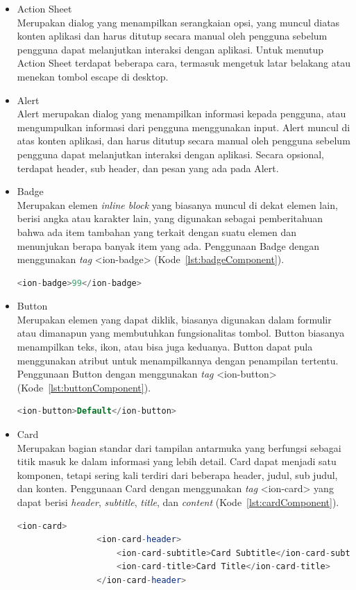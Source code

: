 \begin{itemize}
	\item Action Sheet \\
	Merupakan dialog yang menampilkan serangkaian opsi, yang muncul diatas konten aplikasi dan harus ditutup secara manual oleh pengguna sebelum pengguna dapat melanjutkan interaksi dengan aplikasi. Untuk menutup Action Sheet terdapat beberapa cara, termasuk mengetuk latar belakang atau menekan tombol escape di desktop.

	\item Alert \\
	Alert merupakan dialog yang menampilkan informasi kepada pengguna, atau mengumpulkan informasi dari pengguna menggunakan input. Alert muncul di atas konten aplikasi, dan harus ditutup secara manual oleh pengguna sebelum pengguna dapat melanjutkan interaksi dengan aplikasi. Secara opsional, terdapat header, sub header, dan pesan yang ada pada Alert.
	\item Badge \\
	Merupakan elemen {\it inline block} yang biasanya muncul di dekat elemen lain, berisi angka atau karakter lain, yang digunakan sebagai pemberitahuan bahwa ada item tambahan yang terkait dengan suatu elemen dan menunjukan berapa banyak item yang ada. Penggunaan Badge dengan menggunakan {\it tag} <ion-badge> (Kode~\ref{lst:badgeComponent}).
	\begin{lstlisting}[language=php, label={lst:badgeComponent}, caption=Potongan Kode Program dari Badge Component]
			<ion-badge>99</ion-badge>
	\end{lstlisting} 
	\item Button \\
	Merupakan elemen yang dapat diklik, biasanya digunakan dalam formulir atau dimanapun yang membutuhkan fungsionalitas tombol. Button biasanya menampilkan teks, ikon, atau bisa juga keduanya. Button dapat pula menggunakan atribut untuk menampilkannya dengan penampilan tertentu. Penggunaan Button dengan menggunakan {\it tag} <ion-button>  (Kode~\ref{lst:buttonComponent}).
	\begin{lstlisting}[language=php, label={lst:buttonComponent}, caption=Potongan Kode Program dari Button Component]
			<ion-button>Default</ion-button>
	\end{lstlisting} 
	\item Card \\
	Merupakan bagian standar dari tampilan antarmuka yang berfungsi sebagai titik masuk ke dalam informasi yang lebih detail. Card dapat menjadi satu komponen, tetapi sering kali terdiri dari beberapa header, judul, sub judul, dan konten. Penggunaan Card dengan menggunakan {\it tag} <ion-card> yang dapat berisi {\it header}, {\it subtitle}, {\it title}, dan {\it content} (Kode~\ref{lst:cardComponent}).
	\begin{lstlisting}[language=php, label={lst:cardComponent}, caption=Potongan Kode Program dari Card Component]
			<ion-card>
				<ion-card-header>
					<ion-card-subtitle>Card Subtitle</ion-card-subtitle>
					<ion-card-title>Card Title</ion-card-title>
				</ion-card-header>
				

\end{lstlisting}
\end{itemize}
